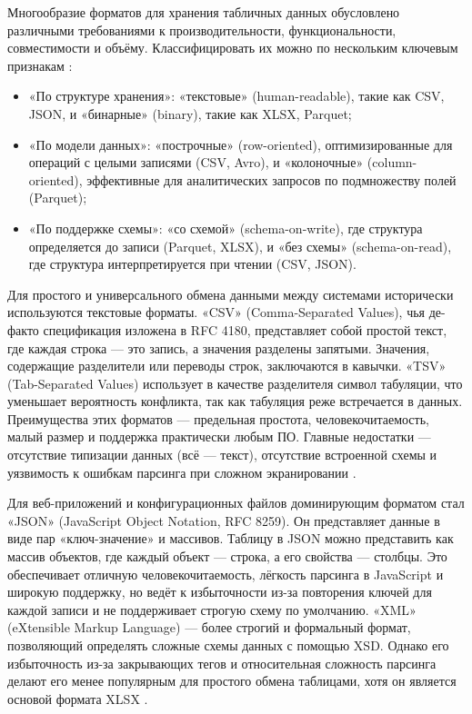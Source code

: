 \documentclass{SibFU-docs}
\begin{document}
Многообразие форматов для хранения табличных данных обусловлено различными требованиями к производительности, функциональности, совместимости и объёму. Классифицировать их можно по нескольким ключевым признакам \cite{quadratic_common_file_formats_2025}:
\begin{itemize}[label=-]
\item «По структуре хранения»: «текстовые» (human-readable), такие как CSV, JSON, и «бинарные» (binary), такие как XLSX, Parquet;
\item «По модели данных»: «построчные» (row-oriented), оптимизированные для операций с целыми записями (CSV, Avro), и «колоночные» (column-oriented), эффективные для аналитических запросов по подмножеству полей (Parquet);
\item «По поддержке схемы»: «со схемой» (schema-on-write), где структура определяется до записи (Parquet, XLSX), и «без схемы» (schema-on-read), где структура интерпретируется при чтении (CSV, JSON).
\end{itemize}

Для простого и универсального обмена данными между системами исторически используются текстовые форматы. «CSV» (Comma-Separated Values), чья де-факто спецификация изложена в RFC 4180, представляет собой простой текст, где каждая строка --- это запись, а значения разделены запятыми. Значения, содержащие разделители или переводы строк, заключаются в кавычки. «TSV» (Tab-Separated Values) использует в качестве разделителя символ табуляции, что уменьшает вероятность конфликта, так как табуляция реже встречается в данных. Преимущества этих форматов --- предельная простота, человекочитаемость, малый размер и поддержка практически любым ПО. Главные недостатки --- отсутствие типизации данных (всё --- текст), отсутствие встроенной схемы и уязвимость к ошибкам парсинга при сложном экранировании \cite{ietf_rfc4180_csv_2005}.

Для веб-приложений и конфигурационных файлов доминирующим форматом стал «JSON» (JavaScript Object Notation, RFC 8259). Он представляет данные в виде пар «ключ-значение» и массивов. Таблицу в JSON можно представить как массив объектов, где каждый объект --- строка, а его свойства --- столбцы. Это обеспечивает отличную человекочитаемость, лёгкость парсинга в JavaScript и широкую поддержку, но ведёт к избыточности из-за повторения ключей для каждой записи и не поддерживает строгую схему по умолчанию. «XML» (eXtensible Markup Language) --- более строгий и формальный формат, позволяющий определять сложные схемы данных с помощью XSD. Однако его избыточность из-за закрывающих тегов и относительная сложность парсинга делают его менее популярным для простого обмена таблицами, хотя он является основой формата XLSX \cite{json_rfc8259_2017, ecma_office_open_xml_2016}.
\end{document}

